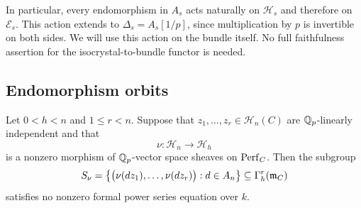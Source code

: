 In particular, every endomorphism in $A_s$ acts naturally on
$\mathcal H_s$ and therefore on $\mathcal E_s$.  This action extends
to $\Delta_s=A_s[1/p]$, since multiplication by $p$ is invertible on
both sides.  We will use this action on the bundle itself.  No full
faithfulness assertion for the isocrystal-to-bundle functor is needed.

\subsection{Endomorphism orbits}

\begin{proposition}[Nondegeneracy]
\label{bundles:nondegeneracy}
Let $0<h<n$ and $1\leq r<n$.  Suppose that
$z_1,\ldots,z_r\in\mathcal H_n(C)$ are $\mathbb Q_p$-linearly independent
and that
\[
  \nu:\mathcal H_n\longrightarrow\mathcal H_h
\]
is a nonzero morphism of $\mathbb Q_p$-vector space sheaves on $\operatorname{Perf}_C$.
Then the subgroup
\[
  S_\nu=\bigl\{\bigl(\nu(dz_1),\ldots,\nu(dz_r)\bigr):
                    d\in A_n\bigr\}
       \subseteq\Gamma_h^r(\mathfrak m_C)
\]
satisfies no nonzero formal power series equation over $k$.
\end{proposition}

